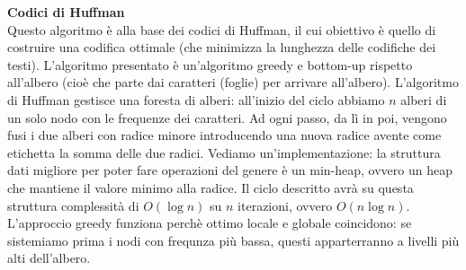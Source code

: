 \documentclass[a4paper,12pt]{article}
\begin{document}
\textbf{Codici di Huffman} \\
Questo algoritmo è alla base dei codici di Huffman, il cui obiettivo è quello di costruire una codifica ottimale (che minimizza la lunghezza delle codifiche dei testi).
L'algoritmo presentato è un'algoritmo greedy e bottom-up rispetto all'albero (cioè che parte dai caratteri (foglie) per arrivare all'albero).
L'algoritmo di Huffman gestisce una foresta di alberi: all'inizio del ciclo abbiamo $n$ alberi di un solo nodo con le frequenze dei caratteri.
Ad ogni passo, da lì in poi, vengono fusi i due alberi con radice minore introducendo una nuova radice avente come etichetta la somma delle due radici. Vediamo un'implementazione:
la struttura dati migliore per poter fare operazioni del genere è un min-heap, ovvero un heap che mantiene il valore minimo alla radice.
Il ciclo descritto avrà su questa struttura complessità di $O(\log{n})$ su $n$ iterazioni, ovvero $O(n\log{n})$.
L'approccio greedy funziona perchè ottimo locale e globale coincidono: se sistemiamo prima i nodi con frequnza più bassa, questi apparterranno
a livelli più alti dell'albero.
\end{document}

